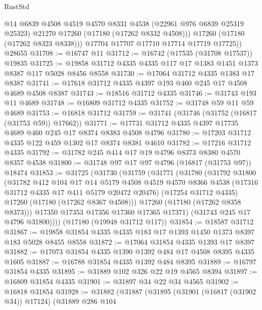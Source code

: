 \begin{lexlean}{RustStd}
\begin{coremodule}
{\begin{coremodule}
{{{{{{{{{{{{{{{{{{{{{{{{{{{{{{{{{{{{{{{{{{{{{{{{{{{{{{{            @14
            @6839
            @4508
            @4519
            @4570
            @8331
            @4538
            (@22961 @976 @6839 @25319 @25323)
            @21270
            @17260
            (@17180 (@17262 @8332 @4508)))
          @17260
          (@17180 (@17262 @8323 @8338)))
        @17704
        @17707
        @17710
        @17714
        @17719
        @17725))
    @28655
@31708 := @16747 @11
@31712 := @16742 (@17535 (@31708 @17537)) @19835
@31725 := @19858 @31712 @4335 @4335 @117 @17 @1383 @1451 @1373 @8387 @117 @5028 @8456 @8558
@31730 := @17064 @31712 @4335 @1383 @17 @8387
@31741 := @17618 @31712 @4335 @4397 @193 @460 @245 @17 @4508 @4689 @4508 @8387
@31743 := @18516 @31712 @4335
@31746 := @31743 @193 @11 @4689
@31748 := @16809 @31712 @4335
@31752 := @31748 @59 @11 @59 @4689
@31753 := @16818 @31712
@31759 := @31741 (@31746 (@31752 (@16817 (@31753 @59)) @17662))
@31771 := @17731 @31712 @4335 @4397 @17735 @4689 @460 @245 @17 @8374 @8383 @4508 @4796
@31780 := @17203 @31712 @4335 @122 @459 @1302 @17 @8374 @8381 @4610
@31782 := @17216 @31712 @4335
@31792 := @31782 @245 @414 @17 @19 @4796 @8373 @8380 @4570 @8357 @4538
@31800 := @31748 @97 @17 @97 @4796 (@16817 (@31753 @97)) @18474
@31853 := @31725
    (@31730
      (@31759
        (@31771
          (@31780
            (@31792
              @31800
              (@31782
                @412
                @104
                @17
                @14
                @5179
                @4508
                @4519
                @4570
                @8366
                @4538
                (@17316 @31712 @4335 @17 @411 @5179 @20472 @20476)
                (@17254 @31712 @4335)
                @17260
                (@17180 (@17262 @8367 @4508)))
              @17260
              (@17180 (@17262 @8358 @8373)))
            @17350
            @17353
            @17356
            @17360
            @17365
            @17371)
          (@31743 @245 @17 @4796 @31800))))
    (@17180 (@19948 @31712 @117))
@31854 := @18587 @31712
@31867 := @19858 @31854 @4335 @4335 @183 @17 @1393 @1450 @1373 @8397 @183 @5028 @8455 @8558
@31872 := @17064 @31854 @4335 @1393 @17 @8397
@31882 := @17073 @31854 @4335 @1390 @1392 @484 @17 @4508 @8395 @4335 @1605
@31887 := @16788 @31854 @4335 @1392 @484 @8395
@31889 := @16797 @31854 @4335
@31895 := @31889 @102 @326 @22 @19 @4565 @8394
@31897 := @16809 @31854 @4335
@31901 := @31897 @34 @22 @34 @4565
@31902 := @16818 @31854
@31928 := @31882
    (@31887
      (@31895
        (@31901 (@16817 (@31902 @34)) @17124)
        (@31889
          @286
          @104
}}}}}}}}}}}}}}}}}}}}}}}}}}}}}}}}}}}}}}}}}}}}}}}}}}}}}}}
\end{coremodule}}
\end{coremodule}
\end{lexlean}
